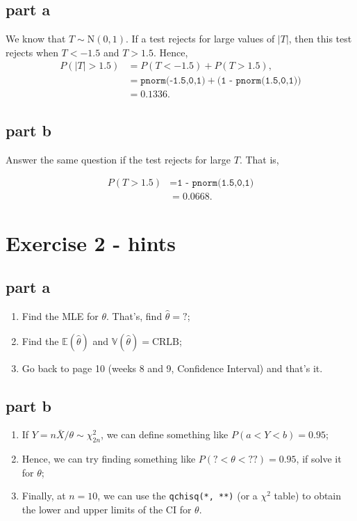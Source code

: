 \documentclass[12pt]{article}
\begin{document}
\subsection*{part a}

We know that $T \sim \mbox{N}(0,1)$. If a test rejects for large values of $|T|$, then this test rejects when $T < -1.5$ and $T > 1.5$. Hence,
\begin{align}
    P(|T| > 1.5) & = P(T < -1.5) + P(T > 1.5), \\
& = \texttt{pnorm(-1.5,0,1)} + \texttt{(1 - pnorm(1.5,0,1))} \\
& = 0.1336.
\end{align}

\subsection*{part b}
Answer the same question if the test rejects for large $T$. That is,

\begin{align}
    P(T > 1.5) & = \texttt{1 - pnorm(1.5,0,1)} \\
& = 0.0668.
\end{align}

\section*{Exercise 2 - hints}

\subsection*{part a}

\begin{enumerate}
    \item Find the MLE for $\theta$. That's, find $\hat{\theta} = ?$;
    \item Find the $\mathbb{E}(\hat{\theta})$ and $\mathbb{V}(\hat{\theta}) = \mbox{CRLB}$;
    \item Go back to page 10 (weeks 8 and 9, Confidence Interval) and that's it.
\end{enumerate}


\subsection*{part b}

\begin{enumerate}
\item If $Y = n\bar{X}/\theta \sim \chi^{2}_{2n}$, we can define something like $P(a < Y < b) = 0.95$;
\item Hence, we can try finding something like $P(? < \theta < ??) = 0.95$, if solve it for $\theta$;
\item Finally, at $n = 10$, we can use the \texttt{qchisq(*, **)} (or a $\chi^{2}$ table) to obtain the lower and upper limits of the CI for $\theta$. 
\end{enumerate}
\end{document}
